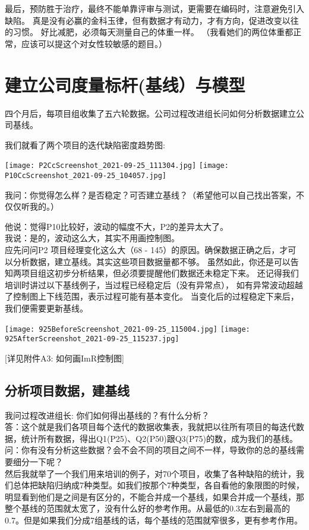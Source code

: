 最后，预防胜于治疗，最终不能单靠评审与测试，更需要在编码时，注意避免引入缺陷。
真是没有必赢的金科玉律，但有数据才有动力，才有方向，促进改变以往的习惯。
好比减肥，必须每天测量自己的体重一样。
（我看她们的两位体重都正常，应该可以提这个对女性较敏感的题目。）

\hypertarget{ux5efaux7acbux516cux53f8ux5ea6ux91cfux6807ux6746ux57faux7ebfux4e0eux6a21ux578b}{%
\section{建立公司度量标杆(基线）与模型}\label{ux5efaux7acbux516cux53f8ux5ea6ux91cfux6807ux6746ux57faux7ebfux4e0eux6a21ux578b}}

四个月后，每项目组收集了五六轮数据。公司过程改进组长问如何分析数据建立公司基线。

我们就看了两个项目的迭代缺陷密度趋势图:

\texttt{[image: P2CcScreenshot\_2021-09-25\_111304.jpg]}
\texttt{[image: P10CcScreenshot\_2021-09-25\_104057.jpg]}

我问：你觉得怎么样？是否稳定？可否建立基线？（希望他可以自己找出答案，不仅仅听我的。）

他说：觉得P10比较好，波动的幅度不大，P2的差异太大了。\\
我说：是的，波动这么大，其实不用画控制图。\\
应先问问P2 项目经理变化这么大（68 -
145）的原因。确保数据正确之后，才可以分析数据，建立基线。其实这些项目数据量都不够。
虽然如此，你还是可以告知两项目组这初步分析结果，但必须要提醒他们数据还未稳定下来。
还记得我们培训时讲过以下基线例子，当过程已经稳定后（没有异常点），
如有异常波动超越了控制图上下线范围，表示过程可能有基本变化。
当变化后的过程稳定下来后，我们便需要更新基线。


\texttt{[image: 925BeforeScreenshot\_2021-09-25\_115004.jpg]}
\texttt{[image: 925AfterScreenshot\_2021-09-25\_115237.jpg]}

{[}详见附件A3: 如何画ImR控制图{]}

\hypertarget{ux5206ux6790ux9879ux76eeux6570ux636eux5efaux57faux7ebf}{%
\subsection{分析项目数据，建基线}\label{ux5206ux6790ux9879ux76eeux6570ux636eux5efaux57faux7ebf}}

我问过程改进组长: 你们如何得出基线的？有什么分析？\\
答：这个就是我们各项目每个迭代的数据收集表，我就把以往所有项目的每迭代数据，统计所有数据，得出Q1(P25)、Q2(P50)跟Q3(P75)的数，成为我们的基线。\\
问：你有没有分析这些数据？会不会不同的项目之间不一样，导致你的总的基线需要细分一下呢？\\
然后我就举了一个我们用来培训的例子，对70个项目，收集了各种缺陷的统计，我们总体把缺陷归纳成7种类型。如我们按那个7种类型，各自看他的象限图的时候，明显看到他们是之间是有区分的，不能合并成一个基线，如果合并成一个基线，那整个基线的范围就太宽了，没有什么好的参考作用。从最低的0.3左右到最高的0.7。但是如果我们分成7组基线的话，每个基线的范围就窄很多，更有参考作用。\\

